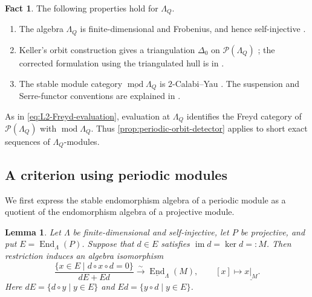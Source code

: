 \documentclass[a4paper,11pt,reqno]{amsart}
\newtheorem{lemma}[lemma]{Lemma}
\theoremstyle{definition}
\newtheorem{fact}[fact]{Fact}
\theoremstyle{plain}
\numberwithin{equation}{section}
\newcommand{\im}{\operatorname{im}}
\newcommand{\End}{\operatorname{End}}
\begin{document}
\begin{fact}
\label{fact:ade-triangulations}
The following properties hold for \(\Lambda_Q\).
\begin{enumerate}[label=\textup{(\roman*)},leftmargin=2.1em]
\item The algebra \(\Lambda_Q\) is finite-dimensional and Frobenius,
and hence self-injective
\cite[Theorem~4.8]{BrennerButlerKing2002}.
\item Keller's orbit construction gives a triangulation \(\Delta_0\)
on \(\mathcal P(\Lambda_Q)\)
\cite[Section~7.3]{Keller2005}; the corrected formulation using the
triangulated hull is in \cite[Section~1]{KellerCorrection}.
\item The stable module category
\(\underline{\operatorname{mod}}\Lambda_Q\) is \(2\)-Calabi--Yau
\cite[Section~8.4, Corollary~1, and Section~8.5, Lemma~2]{Keller2005}.
The suspension and Serre-functor conventions are explained in
\cite[Sections~2.3--2.4]{KellerCorrection}.
\end{enumerate}
\end{fact}

As in \cref{eq:L2-Freyd-evaluation}, evaluation at \(\Lambda_Q\)
identifies the Freyd category of \(\mathcal P(\Lambda_Q)\) with
\(\operatorname{mod}\Lambda_Q\).  Thus
\cref{prop:periodic-orbit-detector} applies to short exact sequences
of \(\Lambda_Q\)-modules.

\subsection{A criterion using periodic modules}

We first express the stable endomorphism algebra of a periodic module
as a quotient of the endomorphism algebra of a projective module.

\begin{lemma}
\label{lem:periodic-block-stable-endomorphisms}
Let \(\Lambda\) be finite-dimensional and self-injective, let \(P\)
be projective, and put
\(E=\End_\Lambda(P)\).  Suppose that \(d\in E\) satisfies
\(\im d=\ker d=:M\).  Then restriction induces an algebra isomorphism
\begin{equation}
\label{eq:periodic-block-stable-endomorphisms}
 \frac{\{x\in E\mid d\circ x\circ d=0\}}{dE+Ed}
 \xrightarrow{\sim}\underline{\End}_\Lambda(M),
 \qquad [x]\longmapsto\underline{x|_M}.
\end{equation}
Here \(dE=\{d\circ y\mid y\in E\}\) and
\(Ed=\{y\circ d\mid y\in E\}\).
\end{lemma}
\end{document}
